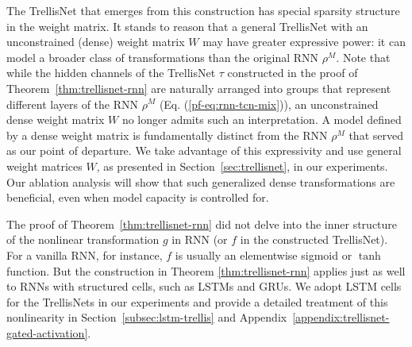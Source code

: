 \documentclass{article} \usepackage{iclr2019_conference,times}
\begin{document}
The TrellisNet that emerges from this construction has special sparsity structure in the weight matrix. It stands to reason that a general TrellisNet with an unconstrained (dense) weight matrix $W$ may have greater expressive power: it can model a broader class of transformations than the original RNN $\rho^M$. Note that while the hidden channels of the TrellisNet $\tau$ constructed in the proof of Theorem~\ref{thm:trellisnet-rnn} are naturally arranged into groups that represent different layers of the RNN $\rho^M$ (Eq. (\ref{pf-eq:rnn-tcn-mix})), an unconstrained dense weight matrix $W$ no longer admits such an interpretation. A model defined by a dense weight matrix is fundamentally distinct from the RNN $\rho^M$ that served as our point of departure. We take advantage of this expressivity and use general weight matrices $W$, as presented in Section~\ref{sec:trellisnet}, in our experiments. Our ablation analysis will show that such generalized dense transformations are beneficial, even when model capacity is controlled for.

The proof of Theorem~\ref{thm:trellisnet-rnn} did not delve into the inner structure of the nonlinear transformation $g$ in RNN (or $f$ in the constructed TrellisNet). For a vanilla RNN, for instance, $f$ is usually an elementwise sigmoid or $\tanh$ function. But the construction in Theorem \ref{thm:trellisnet-rnn} applies just as well to RNNs with structured cells, such as LSTMs and GRUs. We adopt LSTM cells for the TrellisNets in our experiments and provide a detailed treatment of this nonlinearity in Section~\ref{subsec:lstm-trellis} and Appendix~\ref{appendix:trellisnet-gated-activation}.
\end{document}
